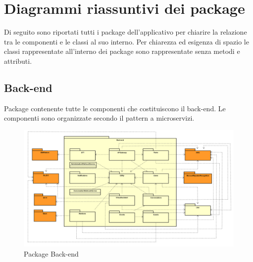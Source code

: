 \section{Diagrammi riassuntivi dei package}
Di seguito sono riportati tutti i package dell’applicativo per chiarire la relazione tra le componenti e le classi al suo interno. Per chiarezza ed esigenza di spazio le classi rappresentate all’interno dei package sono rappresentate senza metodi e attributi.


\subsection{Back-end}
Package contenente tutte le componenti che costituiscono il back-end. Le componenti sono organizzate secondo il pattern a microservizi.
\begin{figure}[h] \centering \includegraphics[width=\textwidth,height=\textheight,keepaspectratio]{images/diagrams/back-end/Official_Backend_0304/Back-end.png}
	\caption{Package Back-end}
\end{figure}
\newpage


